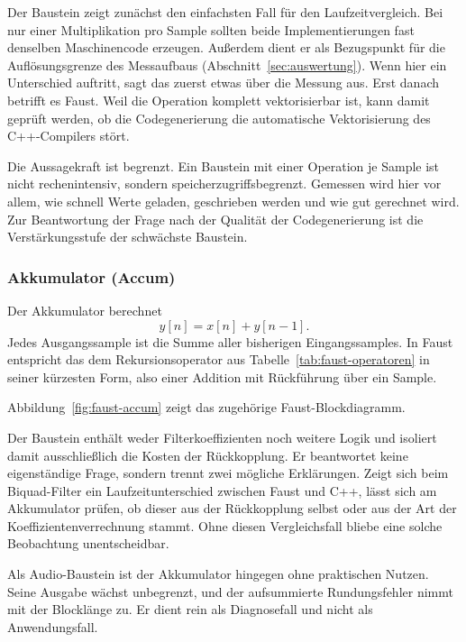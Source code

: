 

Der Baustein zeigt zunächst den einfachsten Fall für den Laufzeitvergleich. Bei nur einer Multiplikation pro Sample sollten beide Implementierungen fast denselben Maschinencode erzeugen. Außerdem dient er als Bezugspunkt für die Auflösungsgrenze des Messaufbaus (Abschnitt~\ref{sec:auswertung}).
Wenn hier ein Unterschied auftritt, sagt das zuerst etwas über die Messung aus. Erst danach betrifft es Faust. Weil die Operation komplett vektorisierbar ist, kann damit geprüft werden, ob die Codegenerierung die automatische Vektorisierung des C++-Compilers stört.

Die Aussagekraft ist begrenzt. Ein Baustein mit einer Operation je Sample ist nicht rechenintensiv, sondern speicherzugriffsbegrenzt. Gemessen wird hier vor allem, wie schnell Werte geladen, geschrieben werden und wie gut gerechnet wird. Zur Beantwortung der Frage nach der Qualität der Codegenerierung ist die Verstärkungsstufe der schwächste Baustein.

\subsubsection*{Akkumulator (Accum)}

Der Akkumulator berechnet
\begin{equation}
	y[n] = x[n] + y[n-1].
	\label{eq:accum}
\end{equation}
Jedes Ausgangssample ist die Summe aller bisherigen Eingangssamples. In Faust
entspricht das dem Rekursionsoperator aus
Tabelle~\ref{tab:faust-operatoren} in seiner kürzesten Form, also einer
Addition mit Rückführung über ein Sample.

Abbildung~\ref{fig:faust-accum} zeigt das zugehörige Faust-Blockdiagramm.



Der Baustein enthält weder Filterkoeffizienten noch weitere Logik und isoliert
damit ausschließlich die Kosten der Rückkopplung. Er beantwortet keine
eigenständige Frage, sondern trennt zwei mögliche Erklärungen.
Zeigt sich beim Biquad-Filter ein Laufzeitunterschied zwischen Faust und C++, lässt sich am Akkumulator prüfen, ob dieser aus der Rückkopplung selbst oder aus der Art der Koeffizientenverrechnung stammt. Ohne diesen Vergleichsfall bliebe eine solche Beobachtung unentscheidbar.

Als Audio-Baustein ist der Akkumulator hingegen ohne praktischen Nutzen. Seine
Ausgabe wächst unbegrenzt, und der aufsummierte Rundungsfehler nimmt mit der
Blocklänge zu. Er dient rein als Diagnosefall und nicht als Anwendungsfall.

